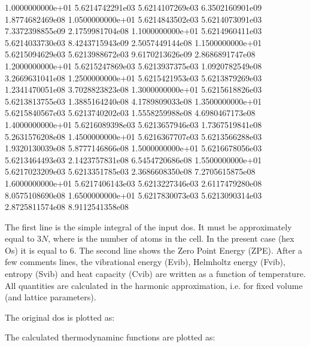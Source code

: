 \documentclass[letterpaper,10pt,english]{sphinxmanual}
\let\sphinxpxdimen\pdfpxdimen\else\newdimen\sphinxpxdimen
\begin{document}
\begin{sphinxVerbatim}[commandchars=\\\{\}]
1.0000000000e+01	5.6214742291e\PYGZhy{}03	5.6214107269e\PYGZhy{}03	6.3502160901e\PYGZhy{}09	1.8774682469e\PYGZhy{}08
1.0500000000e+01	5.6214843502e\PYGZhy{}03	5.6214073091e\PYGZhy{}03	7.3372398855e\PYGZhy{}09	2.1759981704e\PYGZhy{}08
1.1000000000e+01	5.6214960411e\PYGZhy{}03	5.6214033730e\PYGZhy{}03	8.4243715943e\PYGZhy{}09	2.5057449144e\PYGZhy{}08
1.1500000000e+01	5.6215094629e\PYGZhy{}03	5.6213988672e\PYGZhy{}03	9.6170213626e\PYGZhy{}09	2.8686891747e\PYGZhy{}08
1.2000000000e+01	5.6215247869e\PYGZhy{}03	5.6213937375e\PYGZhy{}03	1.0920782549e\PYGZhy{}08	3.2669631041e\PYGZhy{}08
1.2500000000e+01	5.6215421953e\PYGZhy{}03	5.6213879269e\PYGZhy{}03	1.2341470051e\PYGZhy{}08	3.7028823823e\PYGZhy{}08
1.3000000000e+01	5.6215618826e\PYGZhy{}03	5.6213813755e\PYGZhy{}03	1.3885164240e\PYGZhy{}08	4.1789809033e\PYGZhy{}08
1.3500000000e+01	5.6215840567e\PYGZhy{}03	5.6213740202e\PYGZhy{}03	1.5558259988e\PYGZhy{}08	4.6980467173e\PYGZhy{}08
1.4000000000e+01	5.6216089398e\PYGZhy{}03	5.6213657946e\PYGZhy{}03	1.7367519841e\PYGZhy{}08	5.2631576208e\PYGZhy{}08
1.4500000000e+01	5.6216367707e\PYGZhy{}03	5.6213566288e\PYGZhy{}03	1.9320130039e\PYGZhy{}08	5.8777146866e\PYGZhy{}08
1.5000000000e+01	5.6216678056e\PYGZhy{}03	5.6213464493e\PYGZhy{}03	2.1423757831e\PYGZhy{}08	6.5454720686e\PYGZhy{}08
1.5500000000e+01	5.6217023209e\PYGZhy{}03	5.6213351785e\PYGZhy{}03	2.3686608350e\PYGZhy{}08	7.2705615875e\PYGZhy{}08
1.6000000000e+01	5.6217406143e\PYGZhy{}03	5.6213227346e\PYGZhy{}03	2.6117479280e\PYGZhy{}08	8.0575108690e\PYGZhy{}08
1.6500000000e+01	5.6217830073e\PYGZhy{}03	5.6213090314e\PYGZhy{}03	2.8725811574e\PYGZhy{}08	8.9112541358e\PYGZhy{}08
\end{sphinxVerbatim}

The first line is the simple integral of the input dos. It must be approximately equal to \(3N\), where  is the number of atoms in the cell. In the present case (hex Os) it is equal to 6. The second line shows the Zero Point Energy (ZPE). After a few comments lines, the vibrational energy (Evib), Helmholtz energy (Fvib), entropy (Svib) and heat capacity (Cvib) are written as a function of temperature. All quantities are calculated in the harmonic approximation, i.e. for fixed volume (and lattice parameters).

The original dos is plotted as:

\noindent\sphinxincludegraphics[width=500\sphinxpxdimen]{{figure_12}.png}

The calculated thermodynaminc functions are plotted as:
\end{document}
